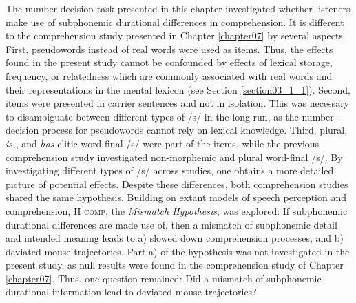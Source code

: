 The number-decision task presented in this chapter investigated whether listeners make use of subphonemic durational differences in comprehension. It is different to the comprehension study presented in Chapter \ref{chapter07} by several aspects. First, pseudowords instead of real words were used as items. Thus, the effects found in the present study cannot be confounded by effects of lexical storage, frequency, or relatedness which are commonly associated with real words and their representations in the mental lexicon (see Section \ref{section03_1_1}). Second, items were presented in carrier sentences and not in isolation. This was necessary to disambiguate between different types of /s/ in the long run, as the number-decision process for pseudowords cannot rely on lexical knowledge. Third, plural, \textit{is}-, and \textit{has}-clitic word-final /s/ were part of the items, while the previous comprehension study investigated non-morphemic and plural word-final /s/. By investigating different types of /s/ across studies, one obtains a more detailed picture of potential effects. Despite these differences, both comprehension studies shared the same hypothesis. Building on extant models of speech perception and comprehension, \textsc{H comp}, the \textit{Mismatch Hypothesis}, was explored: If subphonemic durational differences are made use of, then a mismatch of subphonemic detail and intended meaning leads to a) slowed down comprehension processes, and b) deviated mouse trajectories. Part a) of the hypothesis was not investigated in the present study, as null results were found in the comprehension study of Chapter \ref{chapter07}. Thus, one question remained: Did a mismatch of subphonemic durational information lead to deviated mouse trajectories?

